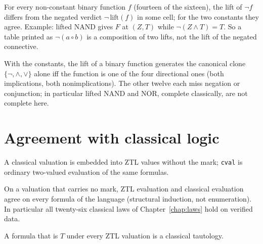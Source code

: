 \begin{theorem}\label{thm:composite}
  \leanok
  For every non-constant binary function $f$ (fourteen of the sixteen), the
  lift of $\neg f$ differs from the negated verdict $\neg\,\mathrm{lift}(f)$
  in some cell; for the two constants they agree. Example: lifted NAND gives
  $F$ at $(Z,T)$ while $\neg(Z\wedge T)=T$. So a table printed as
  $\neg(a\circ b)$ is a composition of two lifts, not the lift of the negated
  connective.
\end{theorem}

\begin{theorem}\label{thm:clone}
  \leanok
  With the constants, the lift of a binary function generates the canonical
  clone $\{\neg,\wedge,\vee\}$ alone iff the function is one of the four
  directional ones (both implications, both nonimplications). The other
  twelve each miss negation or conjunction; in particular lifted NAND and NOR,
  complete classically, are not complete here.
\end{theorem}

\chapter{Agreement with classical logic}

\begin{definition}\label{def:cval}
  \leanok
  A classical valuation is embedded into ZTL values without the mark;
  \texttt{cval} is ordinary two-valued evaluation of the same formulas.
\end{definition}

\begin{theorem}\label{thm:conservative}
  \leanok
  On a valuation that carries no mark, ZTL evaluation and classical
  evaluation agree on every formula of the language (structural induction,
  not enumeration). In particular all twenty-six classical laws of
  Chapter~\ref{chap:laws} hold on verified data.
\end{theorem}

\begin{theorem}\label{thm:taut}
  \leanok
  A formula that is $T$ under every ZTL valuation is a classical tautology.
\end{theorem}

